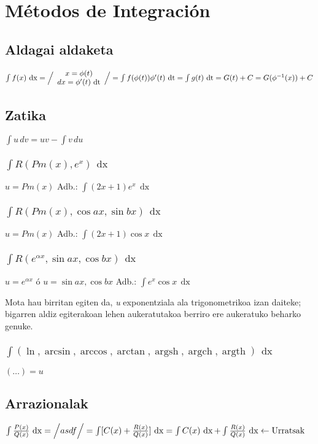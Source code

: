\documentclass[8pt]{article}
\DeclareMathOperator{\xder}{\, \mathrm{d}x}
\DeclareMathOperator{\tder}{\, \mathrm{d}t}
\DeclareMathOperator{\argsh}{argsh}
\DeclareMathOperator{\argch}{argch}
\DeclareMathOperator{\argth}{argth}
\begin{document}
	\section{Métodos de Integración}
		\subsection{Aldagai aldaketa}
			$ \int f(x) \xder = \Big{/}
				\begin{array}{c}
					x = \phi (t) \\
					dx = \phi'(t) \tder
				\end{array}
				\Big{/}
				= \int f(\phi(t)) \phi' (t) \tder =
				\int g(t) \tder = G (t) + C = G (\phi^{-1} (x)) + C
			$
		\subsection{Zatika}
			$ \int u \, dv = uv - \int v \, du $

			\subsubsection{$ \int R (Pm(x), e^x) \xder$}
				$ u = Pm(x) $ \quad 
				Adb.: $ \int (2x + 1) e^x \xder $
			\subsubsection{$ \int R (Pm(x), \cos ax, \sin bx) \xder $}
				$ u = Pm(x) $ \quad
				Adb.: $ \int (2x + 1) \cos x \xder $
			\subsubsection{$ \int R (e^{\alpha x}, \sin ax, \cos bx) \xder $}
				$ u = e^{\alpha x} $ ó $ u = \sin ax, \cos bx $ \quad
				Adb.: $ \int e^x \cos x \xder $

				Mota hau birritan egiten da, \textit{u} exponentziala ala
				trigonometrikoa izan daiteke; bigarren aldiz egiterakoan
				lehen aukeratutakoa berriro ere aukeratuko beharko genuke.

			\subsubsection{$ \int (\ln, \arcsin, \arccos, \arctan, \argsh, \argch, \argth ) \xder $}
				$ ( \dots ) = u $
		\subsection{Arrazionalak}
			$ \int \frac{P(x)}{Q(x)} \xder =
				\Big{/}
					asdf
				\Big{/}
				= \int [ C(x) + \frac{R(x)}{Q(x)} ] \xder =
				\int C(x) \xder + \int \frac{R(x)}{Q(x)} \xder \leftarrow \text{Urratsak} $
\end{document}
